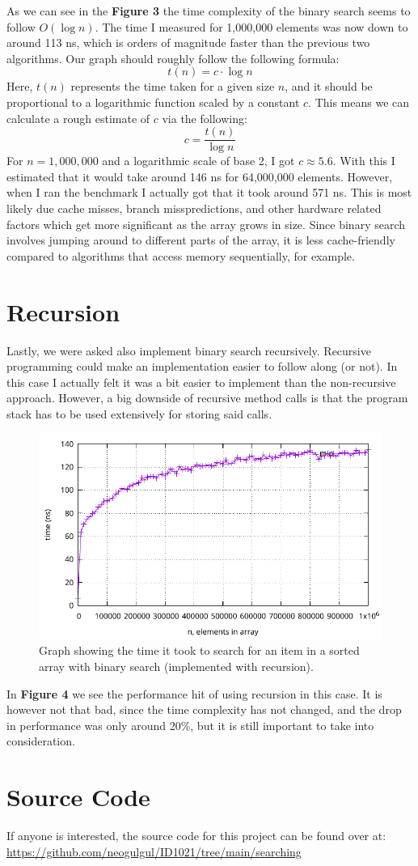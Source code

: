 \documentclass[a4paper, 11pt]{article}
\begin{document}
	\par
	As we can see in the \textbf{Figure 3} the time complexity of the binary search seems to follow \(O(\log n)\).
	The time I measured for 1,000,000 elements was now down to around 113 ns, which is orders of magnitude faster than the previous two algorithms.
	Our graph should roughly follow the following formula:
	\[t(n) = c \cdot \log n\]
	Here, \(t(n)\) represents the time taken for a given size \(n\), and it should be proportional to a logarithmic function scaled by a constant \(c\).
	This means we can calculate a rough estimate of \(c\) via the following:
	\[c = \frac{t(n)}{\log n}\]
	For \(n = 1{,}000{,}000\) and a logarithmic scale of base 2, I got \(c \approx 5.6\).
	With this I estimated that it would take around 146 ns for 64,000,000 elements.
	However, when I ran the benchmark I actually got that it took around 571 ns.
	This is most likely due cache misses, branch misspredictions, and other hardware related factors which get more significant as the array grows in size.
	Since binary search involves jumping around to different parts of the array,
	it is less cache-friendly compared to algorithms that access memory sequentially, for example.

\section{Recursion}
	Lastly, we were asked also implement binary search recursively.
	Recursive programming could make an implementation easier to follow along (or not).
	In this case I actually felt it was a bit easier to implement than the non-recursive approach.
	However, a big downside of recursive method calls is that the program stack has to be used extensively for storing said calls.
	\begin{figure}[H]
		\centering
		\includegraphics[scale=0.8]{graphs/plot_binary_recursive.pdf}
		\caption{
			Graph showing the time it took to search for an item in a sorted array with binary search (implemented with recursion).
		}
	\end{figure}
	\par
	In \textbf{Figure 4} we see the performance hit of using recursion in this case.
	It is however not that bad, since the time complexity has not changed, and the drop in performance was only around 20\%, but it is still important to take into consideration.

\section{Source Code}
	If anyone is interested, the source code for this project can be found over at:
	\url{https://github.com/neogulgul/ID1021/tree/main/searching}
\end{document}
